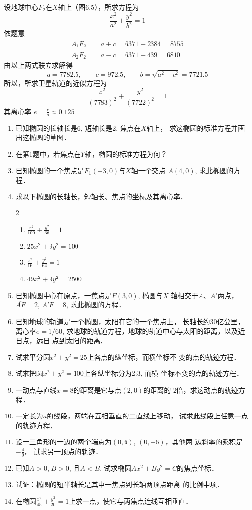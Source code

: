\begin{solution}
    设地球中心$F_2$在$X$轴上（图6.5），所求方程为
\[\frac{x^2}{a^2}+\frac{y^2}{b^2}=1\]
依题意
\[\begin{split}
    \overline{A_1F_2}&=a+c=6371+2384=8755\\
    \overline{A_2F_2}&=a-c=6371+439=6810
\end{split}\]
由以上两式联立求解得
\[a=7782.5,\qquad c=972.5,\qquad b=\sqrt{a^2-c^2}=7721.5\]
所以，所求卫星轨道的近似方程为
\[\frac{x^2}{(7783)^2}+\frac{y^2}{(7722)^2}=1\]
其离心率
$e=\frac{c}{a}\approx 0.125$
\end{solution}

\begin{ex}
\begin{enumerate}
    \item 已知椭圆的长轴长是6, 短轴长是2, 焦点在$X$轴上，
    求这椭圆的标准方程并画出这椭圆的草图．
    \item 在第1题中，若焦点在$Y$轴，椭圆的标准方程为何？
    \item 已知椭圆的一个焦点是$F_1(-3,0)$与$X$轴一个交点
    $A(4,0)$, 求此椭圆的方程．
    \item 求以下椭圆的长轴长，短轴长、焦点的坐标及其离心率．
\begin{multicols}{2}
\begin{enumerate}
    \item $\frac{x^2}{100}+\frac{y^2}{36}=1$
    \item $25x^2+9y^2=100$
    \item $\frac{x^2}{16}+\frac{y^2}{64}=1$
    \item $49x^2+9y^2=2500$
\end{enumerate}
\end{multicols}

\item 已知椭圆中心在原点，一焦点是$F(3,0)$, 椭圆与$X$
轴相交于$A$、$A'$两点，$\overline{AF}=2$, $\overline{A'F}=8$, 求此椭圆的方程．
\item 已知地球的轨道是一个椭圆，太阳在它的一个焦点上，
长轴长约30亿公里，离心率$e=1/60$, 
求地球的轨道方程，地球的轨道中心与太阳的距离，以及近日点，远日
点到太阳的距离．
\item 试求平分圆$x^2+y^2=25$上各点的纵坐标，而横坐标不
变的点的轨迹方程．
\item 试求把圆$x^2+y^2=100$上各纵坐标分为2:3, 而横
坐标不变的点的轨迹方程．
\item 一动点与直线$x=8$的距离是它与点$(2,0)$的距离的
2倍，求这动点的轨迹方程．
\item 一定长为$a$的线段，两端在互相垂直的二直线上移动，
试求此线段上任意一点的轨迹方程．
\item 设一三角形的一边的两个端点为$(0,6)$, $(0,-6)$，其他两
边斜率的乘积是$-\frac{4}{9}$，
试求另一顶点的轨迹．
\item 已知$A>0$, $B>0$, 且$A<B$, 试求椭圆$Ax^2+By^2
=C$的焦点坐标．
\item 试证：椭圆的短半轴长是其中一焦点到长轴两顶点距离
的比例中项．
\item 在椭圆$\frac{x^2}{45}+\frac{y^2}{20}=1$上求一点，使它与两焦点连线互相垂直．
\end{enumerate}
\end{ex}

